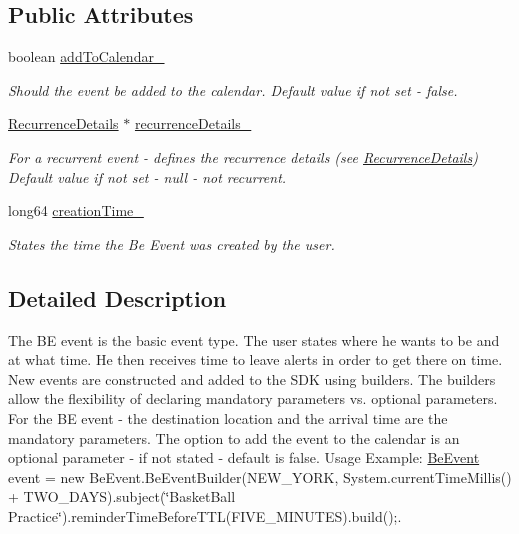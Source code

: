 \subsection*{Public Attributes}
\begin{DoxyCompactItemize}
\item 
boolean \hyperlink{interface_be_event_a9b661d67f5c45c13c83829d2b6bef6dd}{add\+To\+Calendar\+\_\+}
\begin{DoxyCompactList}\small\item\em Should the event be added to the calendar. Default value if not set -\/ false. \end{DoxyCompactList}\item 
\hyperlink{interface_recurrence_details}{Recurrence\+Details} $\ast$ \hyperlink{interface_be_event_a63078bef55c0eb9a855510996160e868}{recurrence\+Details\+\_\+}
\begin{DoxyCompactList}\small\item\em For a recurrent event -\/ defines the recurrence details (see \hyperlink{interface_recurrence_details}{Recurrence\+Details}) Default value if not set -\/ null -\/ not recurrent. \end{DoxyCompactList}\item 
long64 \hyperlink{interface_be_event_a0c8f1ce0619f310180823245198abf6b}{creation\+Time\+\_\+}
\begin{DoxyCompactList}\small\item\em States the time the Be Event was created by the user. \end{DoxyCompactList}\end{DoxyCompactItemize}


\subsection{Detailed Description}
The B\+E event is the basic event type. The user states where he wants to be and at what time. He then receives time to leave alerts in order to get there on time. New events are constructed and added to the S\+D\+K using builders. The builders allow the flexibility of declaring mandatory parameters vs. optional parameters. For the B\+E event -\/ the destination location and the arrival time are the mandatory parameters. The option to add the event to the calendar is an optional parameter -\/ if not stated -\/ default is false. Usage Example\+: \hyperlink{interface_be_event}{Be\+Event} event = new Be\+Event.\+Be\+Event\+Builder(N\+E\+W\+\_\+\+Y\+O\+R\+K, System.\+current\+Time\+Millis() + T\+W\+O\+\_\+\+D\+A\+Y\+S).subject(\char`\"{}\+Basket\+Ball Practice\char`\"{}).reminder\+Time\+Before\+T\+T\+L(\+F\+I\+V\+E\+\_\+\+M\+I\+N\+U\+T\+E\+S).build();. 

